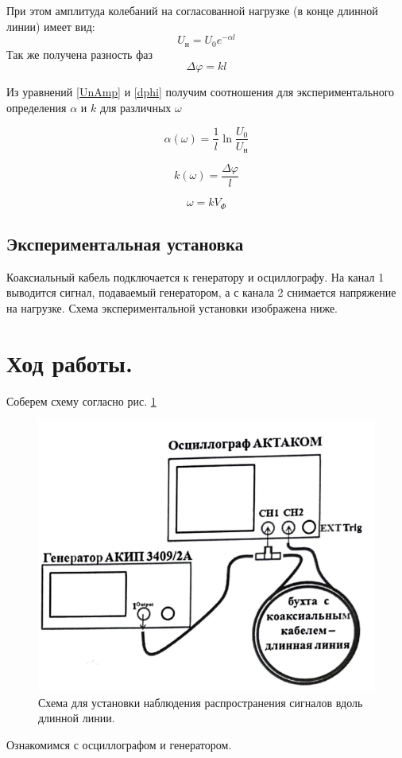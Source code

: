 \documentclass{report}
\begin{document}
При этом амплитуда колебаний на согласованной нагрузке (в конце длинной линии) имеет вид:
\begin{equation}\label{UnAmp}
	U_\text{н}=U_0e^{-\alpha l}
\end{equation}
Так же получена разность фаз
\begin{equation}\label{dphi}
	\Delta \varphi=kl
\end{equation}

Из уравнений \eqref{UnAmp} и \eqref{dphi} получим соотношения для экспериментального определения $\alpha$ и $k$ для различных $\omega$

\begin{equation}\label{alphaomega}
	\alpha(\omega)=\frac{1}{l}\ln\frac{U_0}{U_\text{н}}
\end{equation}

\begin{equation}\label{komega}
	k(\omega)=\frac{\Delta \varphi}{l}
\end{equation}

\begin{equation}\label{k}
	\omega=k V_\Phi
\end{equation}

\subsection{Экспериментальная установка}
Коаксиальный кабель подключается к генератору и осциллографу. На канал 1
выводится сигнал, подаваемый генератором, а с канала 2 снимается напряжение на
нагрузке. Схема экспериментальной установки изображена ниже.

\section{Ход работы.}

Соберем схему согласно рис. \ref{fig:s1}
\begin{figure}[H]
	\centering
	\includegraphics[scale=0.5]{figures/s1.png}
	\caption{Схема для установки наблюдения распространения сигналов вдоль длинной линии.}
	\label{fig:s1}
\end{figure}
Ознакомимся с осциллографом и генератором.
\end{document}
